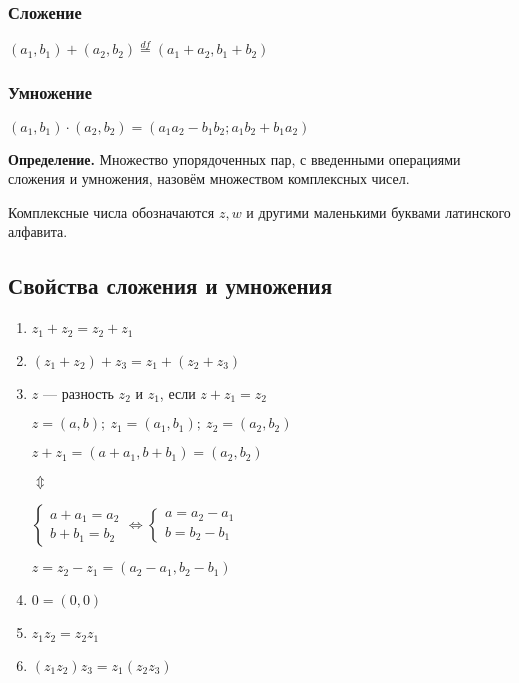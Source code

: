 \documentclass{article}
\begin{document}
    \subsubsection{Сложение}

    \( (a_1, b_1) + (a_2, b_2) \stackrel{df}{=} (a_1 + a_2, b_1 + b_2) \)

    \subsubsection{Умножение}

    \( (a_1, b_1) \cdot (a_2, b_2) = (a_1a_2-b_1b_2; a_1b_2 + b_1a_2)\)

    \textbf{Определение.} Множество упорядоченных пар, с введенными операциями сложения и умножения, назовём множеством комплексных чисел.

    Комплексные числа обозначаются \( z, w \) и другими маленькими буквами латинского алфавита.

    \subsection{Свойства сложения и умножения}

    \begin{enumerate}
        \item \( z_1 + z_2 = z_2 + z_1 \)
        \item \( (z_1 + z_2) + z_3 = z_1 + (z_2 + z_3) \)
        \item \(z\) --- разность \(z_2\) и \(z_1\), если \(z+z_1 = z_2\)
        
        \(z = (a, b);\ z_1 = (a_1, b_1);\ z_2 = (a_2, b_2)\)

        \(z + z_1 = (a+a_1, b + b_1) = (a_2, b_2)\)

        \( \Updownarrow \)

        \( \begin{cases}
            a + a_1 = a_2\\
            b + b_1 = b_2
        \end{cases} \Leftrightarrow \begin{cases}
            a = a_2 - a_1\\
            b = b_2 - b_1
        \end{cases} \)
        
        \(z = z_2 - z_1 = (a_2 - a_1, b_2 - b_1)\)

        \item \( 0 = (0, 0) \)
        \item \(z_1z_2 = z_2z_1\)
        \item \((z_1z_2)z_3 = z_1(z_2z_3)\)
    \end{enumerate}
\end{document}
